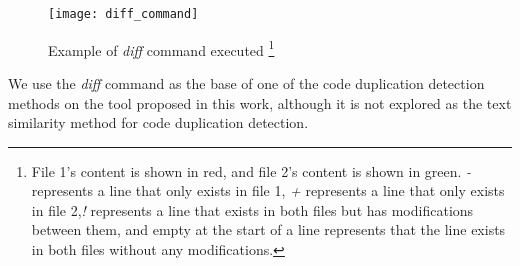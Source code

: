 \begin{figure}
\texttt{[image: diff\_command]}
\caption[Example of \textit{diff} command executed]{
Example of \textit{diff} command executed
\footnote{
File 1's content is shown in red, and file 2's content is shown in green. \textit{-} 
represents a line that only exists in file 1, \textit{+} represents a line that only 
exists in file 2,\textit{!} represents a line that exists in both files but has modifications 
between them, and empty at the start of a line represents that the line exists in 
both files without any modifications.
}
}
\label{fig:diff}
\end{figure}

We use the \textit{diff} command as the base of one of the code duplication detection 
methods on the tool proposed in this work, although it is not explored as the text 
similarity method for code duplication detection.
